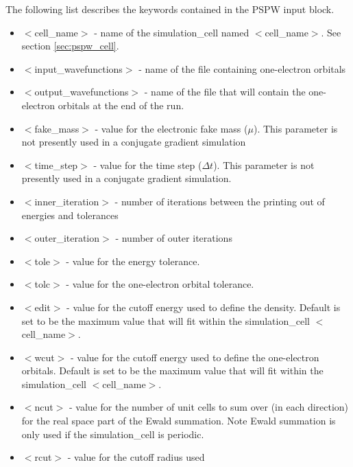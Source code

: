 The following list describes the keywords contained in the PSPW input block.
\begin{itemize}
        \item $<$cell\_name$>$ - name of
              the simulation\_cell named $<$cell\_name$>$.  See section \ref{sec:pspw_cell}.
        \item $<$input\_wavefunctions$>$ - name of the
              file containing one-electron orbitals
        \item $<$output\_wavefunctions$>$ - name of the
              file that will contain the one-electron orbitals at the
              end of the run. 
        \item $<$fake\_mass$>$ - value for the electronic
              fake mass ($\mu$). This parameter is not presently used in a 
              conjugate gradient simulation
        \item $<$time\_step$>$ - value for the time step ($\Delta t$).  This
              parameter is not presently used in a conjugate gradient simulation.
        \item $<$inner\_iteration$>$ - number of iterations between the 
              printing out of energies and tolerances
        \item $<$outer\_iteration$>$ - number of outer iterations
        \item $<$tole$>$ - value for the energy tolerance.
        \item $<$tolc$>$ - value for the one-electron orbital tolerance.
        \item $<$edit$>$ - value for the cutoff energy used
                           to define the density. Default is set
                           to be the maximum value that will fit
                           within the simulation\_cell $<$cell\_name$>$.
        \item $<$wcut$>$ - value for the cutoff energy used
                           to define the one-electron orbitals.
                           Default is set to be the maximum value that 
                           will fit within the simulation\_cell $<$cell\_name$>$.
        \item $<$ncut$>$ - value for the number of unit cells
                          to sum over (in each direction) for the real space
                          part of the Ewald summation. Note Ewald summation
                          is only used if the simulation\_cell is periodic.
        \item $<$rcut$>$ - value for the cutoff radius used

\end{itemize}
